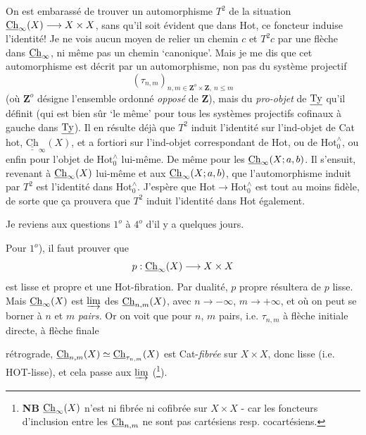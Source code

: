 On est embarassé de trouver un automorphisme $T^2$ de la situation $\underline{\mathrm{Ch}}_{\infty}(X) \longrightarrow X \times X$, sans qu'il soit évident que dans Hot, ce foncteur induise l'identité! Je ne vois aucun moyen de relier un chemin $c$ et $T^2 c$ par une flèche dans $\underline{\mathrm{Ch}}_{\infty}$, ni même pas un chemin `canonique'. Mais je me dis que cet automorphisme est décrit par un automorphisme, non pas du système projectif %
\[
(\tau_{n,m})_{n,m \in \mathbf{Z}^o \times \mathbf{Z},\ n \leq m}
\]
(où $\mathbf{Z}^o$ désigne l'ensemble ordonné \textit{opposé} de $\mathbf{Z}$), mais du \textit{pro-objet} de $\underline{\mathrm{Ty}}$ qu'il définit (qui est bien sûr `le même' pour tous les systèmes projectifs cofinaux à gauche dans $\underline{\mathrm{Ty}}$). Il en résulte déjà que $T^2$ induit l'identité sur l'ind-objet de Cat\,hot, $\underline{\underline{\mathrm{Ch}}}_{\infty}(X)$, et a fortiori sur l'ind-objet correspondant de Hot, ou de $\mathrm{Hot}^{\wedge}_{0}$, ou enfin pour l'objet de $\mathrm{Hot}^{\wedge}_{0}$ lui-même. De même pour les $\underline{\mathrm{Ch}}_{\infty}(X; a, b)$. Il s'ensuit, revenant à $\underline{\mathrm{Ch}}_{\infty}(X)$ lui-même et aux $\underline{\mathrm{Ch}}_{\infty}(X; a, b)$, que l'automorphisme induit par $T^2$ est l'identité dans $\mathrm{Hot}^{\wedge}_{0}$. J'espère que $\mathrm{Hot} \longrightarrow \mathrm{Hot}^{\wedge}_{0}$ est
tout au moins fidèle, de sorte que ça prouvera que $T^2$ induit l'identité dans Hot également.

Je reviens aux questions $1^o$ à $4^o$ d'il y a quelques jours.

Pour $1^o$), il faut prouver que
\[
p : \underline{\mathrm{Ch}}_{\infty}(X) \longrightarrow X \times X
\]
est lisse et propre et une Hot-fibration. Par dualité, $p$ propre résultera de $p$ lisse. Mais $\underline{\mathrm{Ch}}_{\infty}(X)$ est $\varinjlim$ des $\underline{\mathrm{Ch}}_{n,m}(X)$, avec $n \longrightarrow -\infty$, $m \longrightarrow +\infty$, et où on peut se borner à $n$ et $m$ \textit{pairs.} Or on voit que pour $n$, $m$ pairs, i.e. $\tau_{n,m}$ à flèche initiale directe, à flèche finale

rétrograde, $\underline{\mathrm{Ch}}_{n,m}(X) \simeq \underline{\mathrm{Ch}}_{\tau_{n,m}}(X)$ est Cat-\textit{fibrée} sur $X \times X$, donc lisse (i.e. HOT-lisse), et cela passe aux $\varinjlim$ (\footnote[36]{\textbf{NB} $\underline{\mathrm{Ch}}_\infty(X)$ n'est ni fibrée ni cofibrée sur $X \times X$ - car les foncteurs d'inclusion entre les $\underline{\mathrm{Ch}}_{n,m}$ ne sont pas cartésiens resp. cocartésiens.}).

